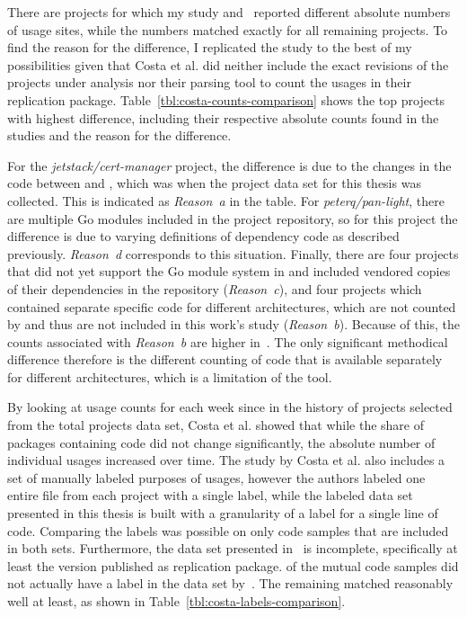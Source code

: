 There are  projects for which my study and~\cite{costa2020} reported different absolute numbers of
\unsafe{} usage sites, while the numbers matched exactly for all remaining projects.
To find the reason for the difference, I replicated the study to the best of my possibilities given that Costa et al.
did neither include the exact revisions of the projects under analysis nor their parsing tool to count the \unsafe{}
usages in their replication package.
Table~\ref{tbl:costa-counts-comparison} shows the top  projects with highest difference, including their
respective absolute counts found in the studies and the reason for the difference.



For the \textit{jetstack/cert-manager} project, the difference is due to the changes in the code between
 and , which was when the project data set for this thesis was collected.
This is indicated as \textit{Reason~a} in the table.
For \textit{peterq/pan-light}, there are multiple Go modules included in the project repository, so for this project
the difference is due to varying definitions of dependency code as described previously.
\textit{Reason~d} corresponds to this situation.
Finally, there are four projects that did not yet support the Go module system in  and included
vendored copies of their dependencies in the repository (\textit{Reason~c}), and four projects which contained separate
specific code for different architectures, which are not counted by \toolGeiger{} and thus are not included in this
work's study (\textit{Reason~b}).
Because of this, the counts associated with \textit{Reason~b} are higher in~\cite{costa2020}.
The only significant methodical difference therefore is the different counting of code that is available separately for
different architectures, which is a limitation of the \toolGeiger{} tool.

By looking at \unsafe{} usage counts for each week since  in the history of  projects
selected from the total projects data set, Costa et al. showed that while the share of packages containing \unsafe{}
code did not change significantly, the absolute number of individual \unsafe{} usages increased over time.
The study by Costa et al. also includes a set of manually labeled purposes of \unsafe{} usages, however the authors
labeled one entire file from each project with a single label, while the labeled data set presented in this thesis is
built with a granularity of a label for a single line of code.
Comparing the labels was possible on only  code samples that are included in both sets.
Furthermore, the data set presented in~\cite{costa2020} is incomplete, specifically at least the version published as
replication package.
 of the  mutual code samples did not actually have a label in the data set
by~\cite{costa2020}.
The remaining  matched reasonably well at least, as shown in Table~\ref{tbl:costa-labels-comparison}.

